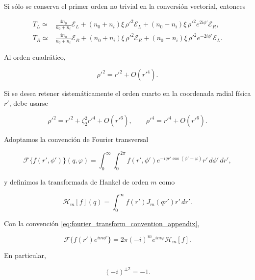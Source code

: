 Si sólo se conserva el primer orden no trivial en la conversión vectorial, entonces

\begin{align}
T_L
\simeq{}&
\frac{4n_0}{n_0+n_i}\mathscr E_L
+
(n_0+n_i)\xi\,\rho'^2\mathscr E_L
+
(n_0-n_i)\xi\,\rho'^2e^{2i\phi'}\mathscr E_R,
\label{eq:TL_second_order_corrected}
\\[8pt]
T_R
\simeq{}&
\frac{4n_0}{n_0+n_i}\mathscr E_R
+
(n_0+n_i)\xi\,\rho'^2\mathscr E_R
+
(n_0-n_i)\xi\,\rho'^2e^{-2i\phi'}\mathscr E_L.
\label{eq:TR_second_order_corrected}
\end{align}

Al orden cuadrático,

\begin{equation}
\rho'^2=r'^2+O(r'^4).
\label{eq:rho_prime_r_prime_second_order}
\end{equation}

Si se desea retener sistemáticamente el orden cuarto en la coordenada radial física \(r'\), debe usarse

\begin{equation}
\rho'^2
=
r'^2+\zeta_2^2r'^4+O(r'^6),
\qquad
\rho'^4
=
r'^4+O(r'^6).
\label{eq:rho_prime_r_prime_fourth_order}
\end{equation}

Adoptamos la convención de Fourier transversal

\begin{equation}
\mathscr F\{f(r',\phi')\}(q,\varphi)
=
\int_0^\infty
\int_0^{2\pi}
f(r',\phi')
e^{-iqr'\cos(\phi'-\varphi)}
r'\,d\phi'\,dr',
\label{eq:fourier_transform_convention_appendix}
\end{equation}

y definimos la transformada de Hankel de orden \(m\) como

\begin{equation}
\mathscr H_m[f](q)
=
\int_0^\infty
f(r')J_m(qr')r'\,dr'.
\label{eq:hankel_transform_definition_appendix}
\end{equation}

Con la convención \eqref{eq:fourier_transform_convention_appendix},

\begin{equation}
\mathscr F\{f(r')e^{im\phi'}\}
=
2\pi(-i)^m e^{im\varphi}\mathscr H_m[f].
\label{eq:fourier_hankel_angular_identity}
\end{equation}

En particular,

\begin{equation}
(-i)^{\pm2}=-1.
\label{eq:hankel_order_two_phase_factor}
\end{equation}


